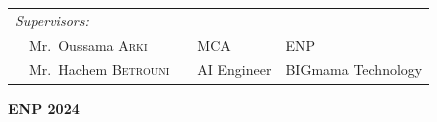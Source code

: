 {\begin{titlepage}
\begin{flushleft}
\begin{tabular}{llcll}
            \\
            \textit{Supervisors:}                                  &  &             &                    \\
            \multicolumn{2}{l}{~~Mr.\ Oussama \textsc{Arki}}       &  & MCA         & ENP                \\
            \multicolumn{2}{l}{~~Mr.\ Hachem \textsc{Betrouni}}    &  & AI Engineer & BIGmama Technology \\
        \end{tabular}
    \end{flushleft}

    \vspace*{8mm}
    \begin{center}
        \textbf{ENP 2024}
    \end{center}

\end{titlepage}
}